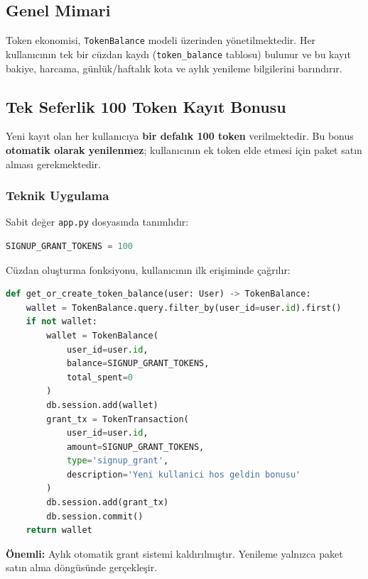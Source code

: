 \documentclass[12pt,a4paper]{article}
\begin{document}
\subsection{Genel Mimari}
Token ekonomisi, \texttt{TokenBalance} modeli \"{u}zerinden y\"{o}netilmektedir. Her kullan{\i}c{\i}n{\i}n tek bir
c\"{u}zdan kayd{\i} (\texttt{token\_balance} tablosu) bulunur ve bu kay{\i}t bakiye, harcama,
g\"{u}nl\"{u}k/haftal{\i}k kota ve ayl{\i}k yenileme bilgilerini bar{\i}nd{\i}r{\i}r.

\subsection{Tek Seferlik 100 Token Kay{\i}t Bonusu}
Yeni kay{\i}t olan her kullan{\i}c{\i}ya \textbf{bir defal{\i}k 100 token} verilmektedir. Bu bonus
\textbf{otomatik olarak yenilenmez}; kullan{\i}c{\i}n{\i}n ek token elde etmesi i\c{c}in paket
sat{\i}n almas{\i} gerekmektedir.

\subsubsection{Teknik Uygulama}
Sabit de\u{g}er \texttt{app.py} dosyas{\i}nda tan{\i}ml{\i}d{\i}r:

\begin{lstlisting}[language=Python, caption={Signup grant sabiti (app.py sat{\i}r 465)}]
SIGNUP_GRANT_TOKENS = 100
\end{lstlisting}

C\"{u}zdan olu\c{s}turma fonksiyonu, kullan{\i}c{\i}n{\i}n ilk eri\c{s}iminde \c{c}a\u{g}r{\i}l{\i}r:

\begin{lstlisting}[language=Python, caption={get\_or\_create\_token\_balance fonksiyonu}]
def get_or_create_token_balance(user: User) -> TokenBalance:
    wallet = TokenBalance.query.filter_by(user_id=user.id).first()
    if not wallet:
        wallet = TokenBalance(
            user_id=user.id,
            balance=SIGNUP_GRANT_TOKENS,
            total_spent=0
        )
        db.session.add(wallet)
        grant_tx = TokenTransaction(
            user_id=user.id,
            amount=SIGNUP_GRANT_TOKENS,
            type='signup_grant',
            description='Yeni kullanici hos geldin bonusu'
        )
        db.session.add(grant_tx)
        db.session.commit()
    return wallet
\end{lstlisting}

\textbf{\"{O}nemli:} Ayl{\i}k otomatik grant sistemi kald{\i}r{\i}lm{\i}\c{s}t{\i}r. Yenileme yaln{\i}zca paket sat{\i}n alma
d\"{o}ng\"{u}s\"{u}nde ger\c{c}ekle\c{s}ir.
\end{document}
